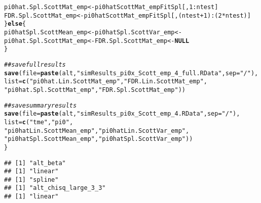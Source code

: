 \documentclass{article}\usepackage[]{graphicx}\usepackage[]{color}
\makeatletter
\newcommand{\hlnum}[1]{\textcolor[rgb]{0.686,0.059,0.569}{#1}}%
\newcommand{\hlstr}[1]{\textcolor[rgb]{0.192,0.494,0.8}{#1}}%
\newcommand{\hlcom}[1]{\textcolor[rgb]{0.678,0.584,0.686}{\textit{#1}}}%
\newcommand{\hlopt}[1]{\textcolor[rgb]{0,0,0}{#1}}%
\newcommand{\hlstd}[1]{\textcolor[rgb]{0.345,0.345,0.345}{#1}}%
\newcommand{\hlkwa}[1]{\textcolor[rgb]{0.161,0.373,0.58}{\textbf{#1}}}%
\newcommand{\hlkwb}[1]{\textcolor[rgb]{0.69,0.353,0.396}{#1}}%
\newcommand{\hlkwc}[1]{\textcolor[rgb]{0.333,0.667,0.333}{#1}}%
\newcommand{\hlkwd}[1]{\textcolor[rgb]{0.737,0.353,0.396}{\textbf{#1}}}%
\newenvironment{kframe}{%
 \def\at@end@of@kframe{}%
 \ifinner\ifhmode%
  \def\at@end@of@kframe{\end{minipage}}%
  \begin{minipage}{\columnwidth}%
 \fi\fi%
 \def\FrameCommand##1{\hskip\@totalleftmargin \hskip-\fboxsep
 \colorbox{shadecolor}{##1}\hskip-\fboxsep
     \hskip-\linewidth \hskip-\@totalleftmargin \hskip\columnwidth}%
 \MakeFramed {\advance\hsize-\width
   \@totalleftmargin\z@ \linewidth\hsize
   \@setminipage}}%
 {\par\unskip\endMakeFramed%
 \at@end@of@kframe}
\newenvironment{knitrout}{}{} %
\makeatother
\begin{document}
\begin{knitrout}
\begin{kframe}
\begin{alltt}
    \hlstd{pi0hat.Spl.ScottMat_emp} \hlkwb{<-} \hlstd{pi0hatScottMat_empFitSpl[,}\hlnum{1}\hlopt{:}\hlstd{ntest]}
    \hlstd{FDR.Spl.ScottMat_emp} \hlkwb{<-} \hlstd{pi0hatScottMat_empFitSpl[,(ntest}\hlopt{+}\hlnum{1}\hlstd{)}\hlopt{:}\hlstd{(}\hlnum{2}\hlopt{*}\hlstd{ntest)]}
  \hlstd{\}} \hlkwa{else} \hlstd{\{}
    \hlstd{pi0hatSpl.ScottMean_emp} \hlkwb{<-} \hlstd{pi0hatSpl.ScottVar_emp} \hlkwb{<-}
      \hlstd{pi0hat.Spl.ScottMat_emp} \hlkwb{<-} \hlstd{FDR.Spl.ScottMat_emp} \hlkwb{<-} \hlkwa{NULL}
  \hlstd{\}}

  \hlcom{##save full results}
  \hlkwd{save}\hlstd{(}\hlkwc{file}\hlstd{=}\hlkwd{paste}\hlstd{(alt,}\hlstr{"simResults_pi0x_Scott_emp_4_full.RData"}\hlstd{,}\hlkwc{sep}\hlstd{=}\hlstr{"/"}\hlstd{),}
       \hlkwc{list}\hlstd{=}\hlkwd{c}\hlstd{(}\hlstr{"pi0hat.Lin.ScottMat_emp"}\hlstd{,} \hlstr{"FDR.Lin.ScottMat_emp"}\hlstd{,}
              \hlstr{"pi0hat.Spl.ScottMat_emp"}\hlstd{,} \hlstr{"FDR.Spl.ScottMat_emp"}\hlstd{))}

  \hlcom{##save summary results}
  \hlkwd{save}\hlstd{(}\hlkwc{file}\hlstd{=}\hlkwd{paste}\hlstd{(alt,}\hlstr{"simResults_pi0x_Scott_emp_4.RData"}\hlstd{,}\hlkwc{sep}\hlstd{=}\hlstr{"/"}\hlstd{),}
       \hlkwc{list}\hlstd{=}\hlkwd{c}\hlstd{(}\hlstr{"tme"}\hlstd{,} \hlstr{"pi0"}\hlstd{,}
              \hlstr{"pi0hatLin.ScottMean_emp"}\hlstd{,} \hlstr{"pi0hatLin.ScottVar_emp"}\hlstd{,}
              \hlstr{"pi0hatSpl.ScottMean_emp"}\hlstd{,} \hlstr{"pi0hatSpl.ScottVar_emp"}\hlstd{))}
\hlstd{\}}
\end{alltt}
\begin{verbatim}
## [1] "alt_beta"
## [1] "linear"
## [1] "spline"
## [1] "alt_chisq_large_3_3"
## [1] "linear"
\end{verbatim}


{\ttfamily\noindent\color{warningcolor}{\#\# Warning in apply(as.matrix(pi0hatScottMat), 2, as.numeric): NAs introduced by coercion}}

{\ttfamily\noindent\bfseries\color{errorcolor}{\#\# Error in apply(as.matrix(pi0hatScottMat), 2, as.numeric): (list) object cannot be coerced to type 'double'}}\end{kframe}
\end{knitrout}
\end{document}
